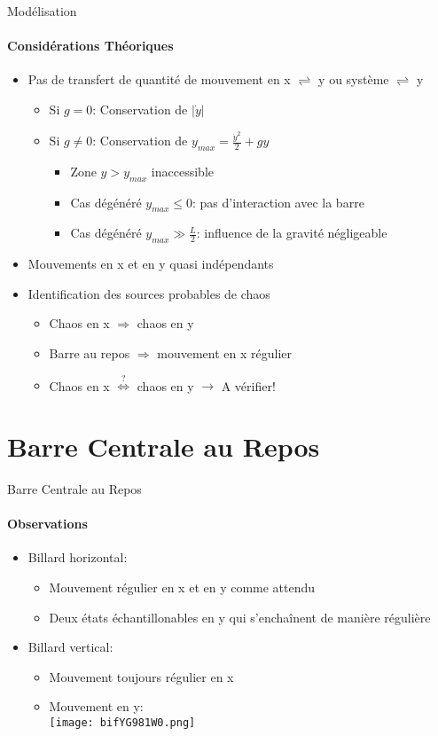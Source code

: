 \documentclass{beamer}
\begin{document}
  \begin{frame}{Modélisation}
  \framesubtitle{Considérations Théoriques}
  \begin{itemize}
    \item Pas de transfert de quantité de mouvement en x \(\rightleftharpoons\) y ou système \(\rightleftharpoons\) y
     \begin{itemize}
       \item Si \(g=0\): Conservation de \(\lvert \dot{y} \rvert\)
       \item Si \(g\neq0\): Conservation de \(y_{max}=\frac{\dot{y}^2}{2}+gy\)
       \begin{itemize}
         \item Zone \(y>y_{max}\) inaccessible
         \pause \item Cas dégénéré \(y_{max} \leq 0\): pas d'interaction avec la barre
         \item Cas dégénéré \(y_{max} \gg \frac{L}{2}\): influence de la gravité négligeable
       \end{itemize}
     \end{itemize}
    \pause \item Mouvements en x et en y quasi indépendants
    \item Identification des sources probables de chaos
    \begin{itemize}
      \pause \item Chaos en x \(\Rightarrow\) chaos en y
      \item Barre au repos \(\Rightarrow\) mouvement en x régulier
      \pause \item Chaos en x \(\overset{?}{\Leftrightarrow}\) chaos en y \(\rightarrow\) A vérifier!
    \end{itemize}
  \end{itemize}
  \end{frame}
  
  \section{Barre Centrale au Repos}
  
  \begin{frame}{Barre Centrale au Repos}
  \framesubtitle{Observations}
  \begin{itemize}
    \item Billard horizontal:
    \begin{itemize}
      \item Mouvement régulier en x et en y comme attendu
      \item Deux états échantillonables en y qui s'enchaînent de manière régulière
    \end{itemize}
    \pause \item Billard vertical:
    \begin{itemize}
      \item Mouvement toujours régulier en x
      \item Mouvement en y:\\
      \pause \texttt{[image: bifYG981W0.png]}
    \end{itemize}
  \end{itemize}
  \end{frame}
  
\end{document}
